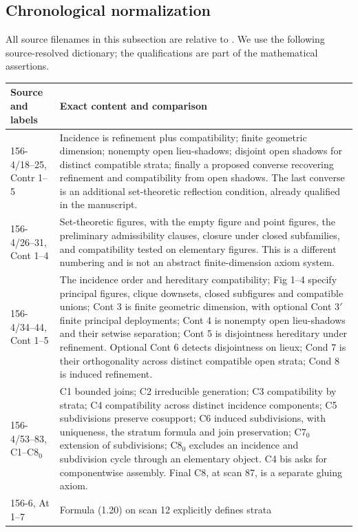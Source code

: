 \subsection{Chronological normalization}

All source filenames in this subsection are relative to
.
We use the following source-resolved dictionary; the qualifications are
part of the mathematical assertions.

\begin{longtable}{p{.17\linewidth}p{.74\linewidth}}
\hline
Source and labels & Exact content and comparison\\ \hline
156-4/18--25, Contr 1--5 & Incidence is refinement plus compatibility;
finite geometric dimension; nonempty open lieu-shadows; disjoint open
shadows for distinct compatible strata; finally a proposed converse
recovering refinement and compatibility from open shadows. The last
converse is an additional set-theoretic reflection condition, already
qualified in the manuscript.\\
156-4/26--31, Cont 1--4 & Set-theoretic figures, with the empty figure and
point figures, the preliminary admissibility clauses, closure under closed subfamilies, and
compatibility tested on elementary figures. This is a different
numbering and is not an abstract finite-dimension axiom system.\\
156-4/34--44, Cont 1--5 & The incidence order and hereditary
compatibility; Fig 1--4 specify principal figures, clique downsets,
closed subfigures and compatible unions; Cont 3 is finite geometric
dimension, with optional Cont 3\( '\) finite principal deployments;
Cont 4 is nonempty open lieu-shadows and their setwise separation;
Cont 5 is disjointness hereditary under refinement. Optional Cont 6
detects disjointness on lieux; Cond 7 is their orthogonality across
distinct compatible open strata; Cond 8 is induced refinement.\\
156-4/53--83, C1--C8\(_0\) & C1 bounded joins; C2 irreducible generation;
C3 compatibility by strata; C4 compatibility across distinct incidence
components; C5 subdivisions preserve cosupport; C6 induced subdivisions,
with uniqueness, the stratum formula and join preservation;
C7\(_0\) extension of subdivisions; C8\(_0\) excludes an incidence and
subdivision cycle through an elementary object. C4 bis asks for
componentwise assembly. Final C8, at scan 87, is a separate gluing axiom.\\
156-6, At 1--7 & Formula (1.20) on scan 12 explicitly defines strata

\end{longtable}
